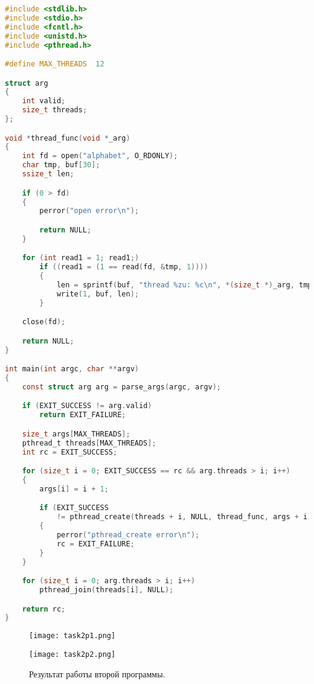 \begin{lstlisting}[language=c, caption={Вторая программа (многопоточный вариант)}]
#include <stdlib.h>
#include <stdio.h>
#include <fcntl.h>
#include <unistd.h>
#include <pthread.h>

#define MAX_THREADS  12

struct arg
{
    int valid;
    size_t threads;
};

void *thread_func(void *_arg)
{
    int fd = open("alphabet", O_RDONLY);
    char tmp, buf[30];
    ssize_t len;

    if (0 > fd)
    {
        perror("open error\n");

        return NULL;
    }

    for (int read1 = 1; read1;)
        if ((read1 = (1 == read(fd, &tmp, 1))))
        {
            len = sprintf(buf, "thread %zu: %c\n", *(size_t *)_arg, tmp);
            write(1, buf, len);
        }

    close(fd);

    return NULL;
}

int main(int argc, char **argv)
{
    const struct arg arg = parse_args(argc, argv);

    if (EXIT_SUCCESS != arg.valid)
        return EXIT_FAILURE;

    size_t args[MAX_THREADS];
    pthread_t threads[MAX_THREADS];
    int rc = EXIT_SUCCESS;

    for (size_t i = 0; EXIT_SUCCESS == rc && arg.threads > i; i++)
    {
        args[i] = i + 1;

        if (EXIT_SUCCESS
            != pthread_create(threads + i, NULL, thread_func, args + i))
        {
            perror("pthread_create error\n");
            rc = EXIT_FAILURE;
        }
    }

    for (size_t i = 0; arg.threads > i; i++)
        pthread_join(threads[i], NULL);

    return rc;
}
\end{lstlisting}

\begin{figure}[h]
    \centering
    \hspace*{\fill}
    \begin{minipage}{0.45\textwidth}
        \centering
        \texttt{[image: task2p1.png]}
    \end{minipage}
    \hfill
    \begin{minipage}{0.4\textwidth}
        \centering
        \texttt{[image: task2p2.png]}
    \end{minipage}
    \hspace*{\fill}
    \caption{Результат работы второй программы.}
\end{figure}

